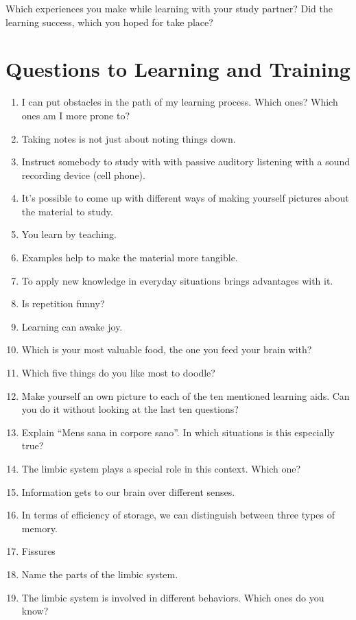 \documentclass[../main.tex]{subfiles}
\begin{document}
Which experiences you make while learning with your study partner?
Did the learning success, which you hoped for take place?

\section[Question]{Questions to Learning and Training}
\begin{enumerate}
\item I can put obstacles in the path of my learning process. Which ones? Which ones am I more prone to?
  \vspace{4mm}
\item Taking notes is not just about noting things down.
\item Instruct somebody to study with with passive auditory listening with a sound recording device (cell phone).
\item It's possible to come up with different ways of making yourself pictures about the material to study.
\item You learn by teaching.
\item Examples help to make the material more tangible.
\item To apply new knowledge in everyday situations brings advantages with it.
\item Is repetition funny?
\item Learning can awake joy.
\item Which is your most valuable food, the one you feed your brain with?
\item Which five things do you like most to doodle?
\item Make yourself an own picture to each of the ten mentioned learning aids.
  Can you do it without looking at the last ten questions?
    \vspace{4mm}
\item Explain ``Mens sana in corpore sano''. In which situations is this especially true?
\item The limbic system plays a special role in this context. Which one?
\item Information gets to our brain over different senses.
\item In terms of efficiency of storage, we can distinguish between three types of memory.
\item Fissures
      \vspace{4mm}
\item Name the parts of the limbic system.
\item The limbic system is involved in different behaviors. Which ones do you know?

\end{enumerate}
\end{document}
